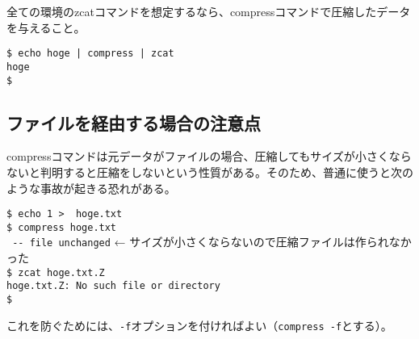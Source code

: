 全ての環境のzcatコマンドを想定するなら、compressコマンドで圧縮したデータを与えること。
\begin{screen}
	\verb!$ echo hoge | compress | zcat! \return \\
	\verb|hoge|                                  \\
	\verb|$ |
\end{screen}

\subsection*{ファイルを経由する場合の注意点}

compressコマンドは元データがファイルの場合、圧縮してもサイズが小さくならないと判明すると圧縮をしないという性質がある。そのため、普通に使うと次のような事故が起きる恐れがある。
\begin{screen}
	\verb!$ echo 1 >  hoge.txt! \return          \\
	\verb!$ compress hoge.txt! \return           \\
	\verb! -- file unchanged! ← サイズが小さくならないので圧縮ファイルは作られなかった \\
	\verb!$ zcat hoge.txt.Z! \return             \\
	\verb!hoge.txt.Z: No such file or directory! \\
	\verb!$ !
\end{screen}
これを防ぐためには、\verb|-f|オプションを付ければよい（\verb|compress -f|とする）。